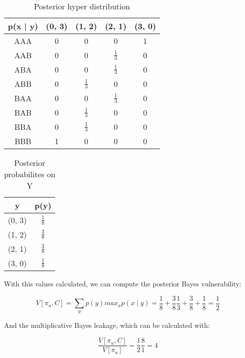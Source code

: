 \documentclass{article}
\begin{document}
\begin{enumerate}
\begin{enumerate}
		            \begin{table}[H]
			            \centering
			            \begin{tabular}{|c|c|c|c|c|}
				            \hline
				            p(x | y) & (0, 3) & (1, 2)        & (2, 1)        & (3, 0) \\ \hline
				            AAA      & 0      & 0             & 0             & 1      \\ \hline
				            AAB      & 0      & 0             & $\frac{1}{3}$ & 0      \\ \hline
				            ABA      & 0      & 0             & $\frac{1}{3}$ & 0      \\ \hline
				            ABB      & 0      & $\frac{1}{3}$ & 0             & 0      \\ \hline
				            BAA      & 0      & 0             & $\frac{1}{3}$ & 0      \\ \hline
				            BAB      & 0      & $\frac{1}{3}$ & 0             & 0      \\ \hline
				            BBA      & 0      & $\frac{1}{3}$ & 0             & 0      \\ \hline
				            BBB      & 1      & 0             & 0             & 0      \\ \hline
			            \end{tabular}
			            \caption{Posterior hyper distribution}
		            \end{table}


		            \begin{table}[H]
			            \centering
			            \begin{tabular}{|c|c|}
				            \hline
				            y      & p(y)          \\ \hline
				            (0, 3) & $\frac{1}{8}$ \\ \hline
				            (1, 2) & $\frac{3}{8}$ \\ \hline
				            (2, 1) & $\frac{3}{8}$ \\ \hline
				            (3, 0) & $\frac{1}{8}$ \\ \hline
			            \end{tabular}
			            \caption{Posterior probabilites on Y}
		            \end{table}
		            With this values calculated, we can compute the posterior Bayes vulnerability:

		            \[V[\pi_u, C] = \sum_y p(y) max_x p(x \mid y) = \frac{1}{8} + \frac{3}{8} \frac{1}{3} + \frac{3}{8} + \frac{1}{8} = \frac{1}{2}\]

		            And the multiplicative Bayes leakage, which can be calculated with:

		            \[\frac{V[\pi_u, C]}{V[\pi_u]} = \frac{1}{2} \frac{8}{1} = 4\]
	      \end{enumerate}
\end{enumerate}


\nocite{*}
\end{document}
